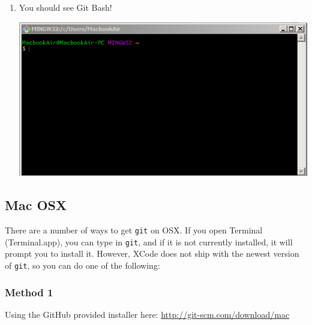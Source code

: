 \documentclass[11pt,fleqn]{article}
\theoremstyle{definition}
\begin{document}
\begin{enumerate}[Step 1.]
\item You should see Git Bash!
\begin{center}
\includegraphics[scale=0.6]{gitwininstall13.png}
\end{center}
\end{enumerate}

\newpage
\subsection{Mac OSX}
There are a number of ways to get \texttt{git} on OSX. If you open Terminal (Terminal.app), you can type in \texttt{git}, and if it is not currently installed, it will prompt you to install it. However, XCode does not ship with the newest version of \texttt{git}, so you can do one of the following:

\subsubsection{Method 1}
Using the GitHub provided installer here: \url{http://git-scm.com/download/mac}
\end{document}
